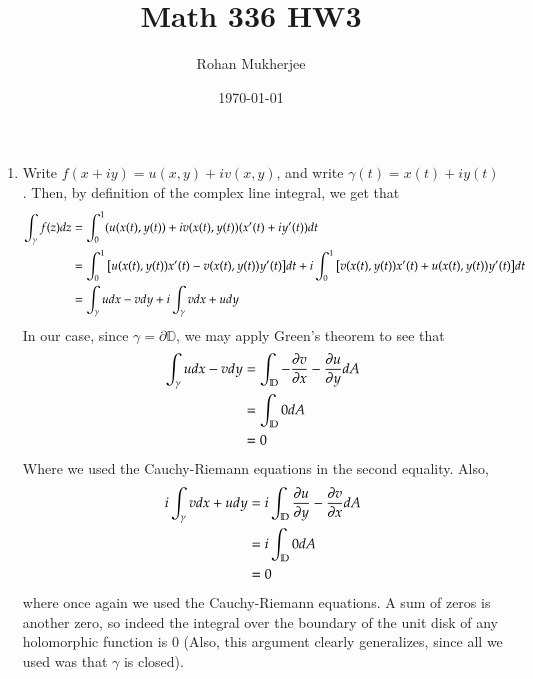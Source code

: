 \documentclass[12pt]{article}
\title{Math 336 HW3}
\date{\today}
\author{Rohan Mukherjee}
\def\mbb#1{\mathbb{#1}}
\theoremstyle{definition}
\theoremstyle{remark}
\def \D{\mbb{D}}
\begin{document}
	\maketitle
	\begin{enumerate}[leftmargin=\labelsep]
		\item Write $f(x+iy) = u(x, y) + iv(x,y)$, and write $\gamma(t) = x(t)+iy(t)$. Then, by definition of the complex line integral, we get that
		\begin{align*}
			\int_\gamma f(z)dz &= \int_0^1 (u(x(t), y(t)) + iv(x(t), y(t))(x'(t)+iy'(t))dt \\
			&= \int_0^1 \qty[u(x(t), y(t))x'(t)-v(x(t),y(t))y'(t)]dt+i\int_0^1 \qty[v(x(t),y(t))x'(t)+u(x(t),y(t))y'(t)]dt \\
			&= \int_\gamma udx - vdy + i\int_\gamma vdx + udy
		\end{align*}
		In our case, since $\gamma = \partial \D$, we may apply Green's theorem to see that
		\begin{align*}
			\int_\gamma udx - vdy &= \int_\D -\pdv{v}{x}-\pdv{u}{y} dA \\
			&= \int_\D 0 dA \\
			&= 0
		\end{align*}
		Where we used the Cauchy-Riemann equations in the second equality. Also,
		\begin{align*}
			i\int_\gamma vdx + udy &= i\int_\D \pdv{u}{y} - \pdv{v}{x} dA \\
			&= i \int_\D 0 dA \\
			&= 0
		\end{align*}
		where once again we used the Cauchy-Riemann equations. A sum of zeros is another zero, so indeed the integral over the boundary of the unit disk of any holomorphic function is 0 (Also, this argument clearly generalizes, since all we used was that $\gamma$ is closed).
		

\end{enumerate}
\end{document}
